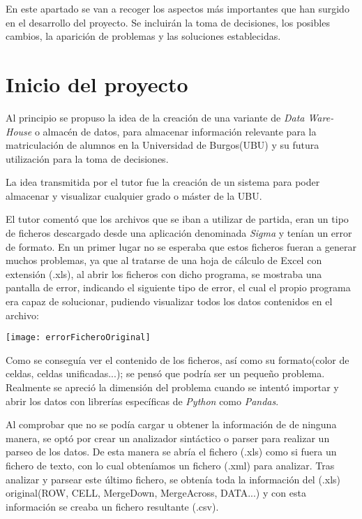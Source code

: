 
En este apartado se van a recoger los aspectos más importantes que han surgido en el desarrollo del proyecto. Se incluirán la toma de decisiones, los posibles cambios, la aparición de problemas y las soluciones establecidas.

\section{Inicio del proyecto}\label{inicio_del_proyecto}

Al principio se propuso la idea de la creación de una variante de \emph{Data Ware-House} o almacén de datos, para almacenar información relevante para la matriculación de alumnos en la Universidad de Burgos(UBU) y su futura utilización para la toma de decisiones.

La idea transmitida por el tutor fue la creación de un sistema para poder almacenar y visualizar cualquier grado o máster de la UBU.

El tutor comentó que los archivos que se iban a utilizar de partida, eran un tipo de ficheros descargado desde una aplicación denominada \emph{Sigma} y tenían un error de formato. En un primer lugar no se esperaba que estos ficheros fueran a generar muchos problemas, ya que al tratarse de una hoja de cálculo de Excel con extensión (.xls), al abrir los ficheros con dicho programa, se mostraba una pantalla de error, indicando el siguiente tipo de error, el cual el propio programa era capaz de solucionar, pudiendo visualizar todos los datos contenidos en el archivo:


\texttt{[image: errorFicheroOriginal]}

Como se conseguía ver el contenido de los ficheros, así como su formato(color de celdas, celdas unificadas...); se pensó que podría ser un pequeño problema. Realmente se apreció la dimensión del problema cuando se intentó importar y abrir los datos con librerías específicas de \emph{Python} como \emph{Pandas}.

Al comprobar que no se podía cargar u obtener la información de de ninguna manera, se optó por crear un analizador sintáctico o parser para realizar un parseo de los datos. De esta manera se abría el fichero (.xls) como si fuera un fichero de texto, con lo cual obteníamos un fichero (.xml) para analizar. Tras analizar y parsear este último fichero, se obtenía toda la información del (.xls) original(ROW, CELL, MergeDown, MergeAcross, DATA...) y con esta información se creaba un fichero resultante (.csv). 

